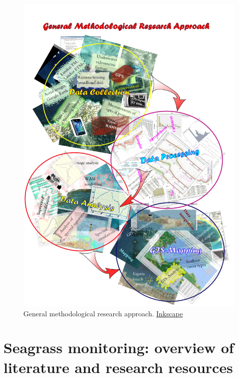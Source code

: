 \documentclass[10pt, a4paper]{article}
\begin{document}
\begin{figure}[H]
	\centering
	\includegraphics[scale=0.6]{UML_GIS.png}
	\caption{General methodological research approach. \href{http://inkscape.org/}{Inkscape}}
	\label{fig:1.11}
\end{figure}

\pagebreak
\section[Overview of literature]{Seagrass monitoring: overview of literature and research resources} \label{sec:2}
\renewcommand{\headrulewidth}{0.4pt}
\end{document}
